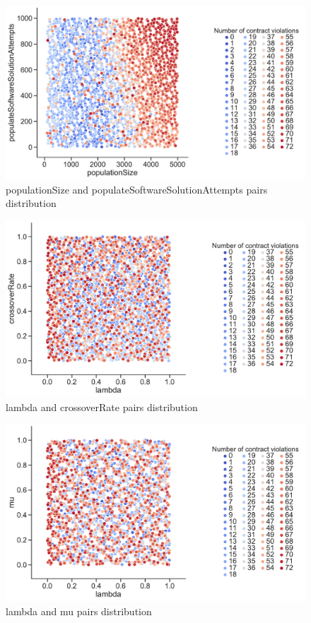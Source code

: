 \begin{figure}
	\centering
	\includegraphics[width=\textwidth]{images/PairsDistr/populationSize_populateSoftwareSolutionAttempts.pdf}
	\caption[populationSize and populateSoftwareSolutionAttempts pairs distribution]{populationSize and populateSoftwareSolutionAttempts pairs distribution}
	\label{fig:populationSize_populateSoftwareSolutionAttempts_pair}
\end{figure}
\clearpage
\begin{figure}
	\centering
	\includegraphics[width=\textwidth]{images/PairsDistr/lambda_crossoverRate.pdf}
	\caption[lambda and crossoverRate pairs distribution]{lambda and crossoverRate pairs distribution}
	\label{fig:lambda_crossoverRate_pair}
\end{figure}
\clearpage
\begin{figure}
	\centering
	\includegraphics[width=\textwidth]{images/PairsDistr/lambda_mu.pdf}
	\caption[lambda and mu pairs distribution]{lambda and mu pairs distribution}
	\label{fig:lambda_mu_pair}
\end{figure}
